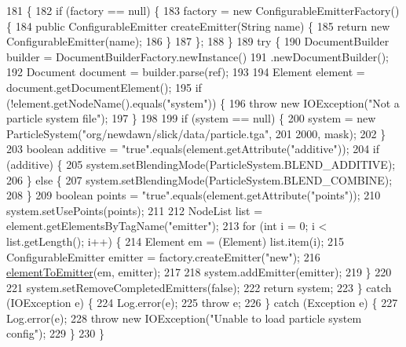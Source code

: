\begin{DoxyCode}
181                                                                                                    \{
182         \textcolor{keywordflow}{if} (factory == null) \{
183             factory = \textcolor{keyword}{new} ConfigurableEmitterFactory() \{
184                 \textcolor{keyword}{public} ConfigurableEmitter createEmitter(String name) \{
185                     \textcolor{keywordflow}{return} \textcolor{keyword}{new} ConfigurableEmitter(name);
186                 \}
187             \};
188         \}
189         \textcolor{keywordflow}{try} \{
190             DocumentBuilder builder = DocumentBuilderFactory.newInstance()
191                     .newDocumentBuilder();
192             Document document = builder.parse(ref);
193 
194             Element element = document.getDocumentElement();
195             \textcolor{keywordflow}{if} (!element.getNodeName().equals(\textcolor{stringliteral}{"system"})) \{
196                 \textcolor{keywordflow}{throw} \textcolor{keyword}{new} IOException(\textcolor{stringliteral}{"Not a particle system file"});
197             \}
198             
199          \textcolor{keywordflow}{if} (system == null) \{
200          system = \textcolor{keyword}{new} ParticleSystem(\textcolor{stringliteral}{"org/newdawn/slick/data/particle.tga"},
201                     2000, mask);
202          \}
203             \textcolor{keywordtype}{boolean} additive = \textcolor{stringliteral}{"true"}.equals(element.getAttribute(\textcolor{stringliteral}{"additive"}));
204             \textcolor{keywordflow}{if} (additive) \{
205                 system.setBlendingMode(ParticleSystem.BLEND\_ADDITIVE);
206             \} \textcolor{keywordflow}{else} \{
207                 system.setBlendingMode(ParticleSystem.BLEND\_COMBINE);
208             \}
209             \textcolor{keywordtype}{boolean} points = \textcolor{stringliteral}{"true"}.equals(element.getAttribute(\textcolor{stringliteral}{"points"}));
210             system.setUsePoints(points);
211 
212             NodeList list = element.getElementsByTagName(\textcolor{stringliteral}{"emitter"});
213             \textcolor{keywordflow}{for} (\textcolor{keywordtype}{int} i = 0; i < list.getLength(); i++) \{
214                 Element em = (Element) list.item(i);
215                 ConfigurableEmitter emitter = factory.createEmitter(\textcolor{stringliteral}{"new"});
216                 \mbox{\hyperlink{classorg_1_1newdawn_1_1slick_1_1particles_1_1_particle_i_o_a0f9a2d655a230395efcb645a520cf988}{elementToEmitter}}(em, emitter);
217 
218                 system.addEmitter(emitter);
219             \}
220 
221             system.setRemoveCompletedEmitters(\textcolor{keyword}{false});
222             \textcolor{keywordflow}{return} system;
223         \} \textcolor{keywordflow}{catch} (IOException e) \{
224             Log.error(e);
225             \textcolor{keywordflow}{throw} e;
226         \} \textcolor{keywordflow}{catch} (Exception e) \{
227             Log.error(e);
228             \textcolor{keywordflow}{throw} \textcolor{keyword}{new} IOException(\textcolor{stringliteral}{"Unable to load particle system config"});
229         \}
230     \}
\end{DoxyCode}
